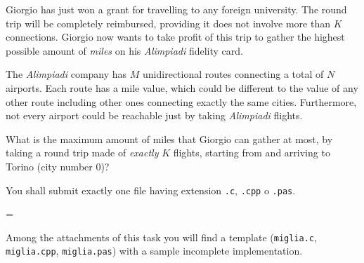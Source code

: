 \usepackage{xcolor}
\usepackage{afterpage}
\usepackage{pifont,mdframed}
\usepackage[bottom]{footmisc}

\makeatletter
\gdef\this@inputfilename{input.txt}
\gdef\this@outputfilename{output.txt}
\makeatother

\newcommand{\inputfile}{\texttt{input.txt}}
\newcommand{\outputfile}{\texttt{output.txt}}

\newenvironment{warning}
  {\par\begin{mdframed}[linewidth=2pt,linecolor=gray]%
    \begin{list}{}{\leftmargin=1cm
                   \labelwidth=\leftmargin}\item[\Large\ding{43}]}
  {\end{list}\end{mdframed}\par}

	Giorgio has just won a grant for travelling to any foreign university. The round trip will be completely reimbursed, providing it does not involve more than $K$ connections. Giorgio now wants to take profit of this trip to gather the highest possible amount of \emph{miles} on his \emph{Alimpiadi} fidelity card.
	
	The \emph{Alimpiadi} company has $M$ unidirectional routes connecting a total of $N$ airports. Each route has a mile value, which could be different to the value of any other route including other ones connecting exactly the same cities. Furthermore, not every airport could be reachable just by taking \emph{Alimpiadi} flights.
	
	What is the maximum amount of miles that Giorgio can gather at most, by taking a round trip made of \emph{exactly} $K$ flights, starting from and arriving to Torino (city number $0$)?

\Implementation
You shall submit exactly one file having extension \texttt{.c}, \texttt{.cpp} o \texttt{.pas}.

\begin{warning}
Among the attachments of this task you will find a template (\texttt{miglia.c}, \texttt{miglia.cpp}, \texttt{miglia.pas}) with a sample incomplete implementation.
\end{warning}


